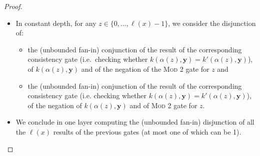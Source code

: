 \documentclass[11pt, oneside]{article}
\newenvironment{toappendix}{}{}
\newcommand{\Nat}{\mathbb{N}}
\newcommand{\AC}{\mathbf{FAC}}
\newcommand{\FACC}{\mathbf{FACC[2]}}
\newcommand{\tu}[1]{\mathbf{#1}}
\theoremstyle{definition}
\newtheorem{defn}{Definition}
\newtheorem{remark}{Remark}
\newcommand{\ODEACC}{\ell\text{-ODE}_{\text{FACC[2]}}}
\newcommand{\schODE}{\ell\text{-b}_0\text{ODE}}
\begin{document}
\begin{toappendix}
\begin{proof}
\begin{itemize}
    \item In constant depth, for any $z\in \{0,\dots, \ell(x)-1\}$, we consider the disjunction of:
    \begin{itemize}
        \itemsep0em
        \item the (unbounded fan-in) conjunction of the result of the corresponding consistency gate (i.e.~checking whether $k(\alpha(z), \tu y)=k'(\alpha(z), \tu y)$), of $k(\alpha(z), \tu y)$ and of the negation of the \textsc{Mod 2} gate for $z$ and
        \item the (unbounded fan-in) conjunction of the result of the corresponding consistency gate (i.e. checking whether $k(\alpha(z), \tu y)=k'(\alpha(z), \tu y)$), of the negation of $k(\alpha(z), \tu y)$ and of \textsc{Mod 2} gate for $z$.
    \end{itemize}
    \item We conclude in one layer computing the (unbounded fan-in) disjunction of all the $\ell(x)$ results of the previous gates (at most one of which can be 1).
\end{itemize}
\end{proof}







%
%
%




\end{toappendix}
\end{document}
